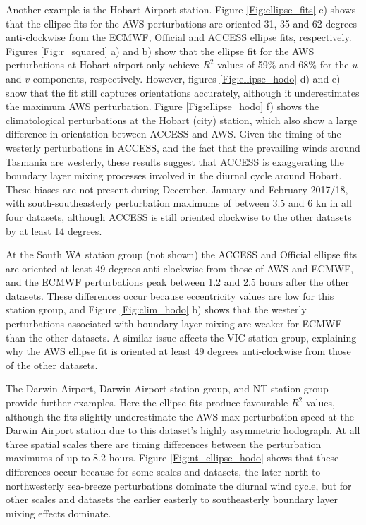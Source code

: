 \documentclass[twocol]{ametsoc}
\begin{document}
Another example is the Hobart Airport station. Figure \ref{Fig:ellipse_fits} c) shows that the ellipse fits for the AWS perturbations are oriented 31, 35 and 62 degrees anti-clockwise from the ECMWF, Official and ACCESS ellipse fits, respectively. Figures \ref{Fig:r_squared} a) and b) show that the ellipse fit for the AWS perturbations at Hobart airport only achieve $R^2$ values of 59\% and 68\% for the $u$ and $v$ components, respectively. However, figures \ref{Fig:ellipse_hodo} d) and e) show that the fit still captures orientations accurately, although it underestimates the maximum AWS perturbation. Figure \ref{Fig:ellipse_hodo} f) shows the climatological perturbations at the Hobart (city) station, which also show a large difference in orientation between ACCESS and AWS. Given the timing of the westerly perturbations in ACCESS, and the fact that the prevailing winds around Tasmania are westerly, these results suggest that ACCESS is exaggerating the boundary layer mixing processes involved in the diurnal cycle around Hobart. These biases are not present during December, January and February 2017/18, with south-southeasterly perturbation maximums of between 3.5 and 6 kn in all four datasets, although ACCESS is still oriented clockwise to the other datasets by at least 14 degrees. 

At the South WA station group (not shown) the ACCESS and Official ellipse fits are oriented at least 49 degrees anti-clockwise from those of AWS and ECMWF, and the ECMWF perturbations peak between 1.2 and 2.5 hours after the other datasets. These differences occur because eccentricity values are low for this station group, and Figure \ref{Fig:clim_hodo} b) shows that the westerly perturbations associated with boundary layer mixing are weaker for ECMWF than the other datasets. A similar issue affects the VIC station group, explaining why the AWS ellipse fit is oriented at least 49 degrees anti-clockwise from those of the other datasets.  

The Darwin Airport, Darwin Airport station group, and NT station group provide further examples. Here the ellipse fits produce favourable $R^2$ values, although the fits slightly underestimate the AWS max perturbation speed at the Darwin Airport station due to this dataset's highly asymmetric hodograph. At all three spatial scales there are timing differences between the perturbation maximums of up to 8.2 hours. Figure \ref{Fig:nt_ellipse_hodo} shows that these differences occur because for some scales and datasets, the later north to northwesterly sea-breeze perturbations dominate the diurnal wind cycle, but for other scales and datasets the earlier easterly to southeasterly boundary layer mixing effects dominate.
\end{document}
